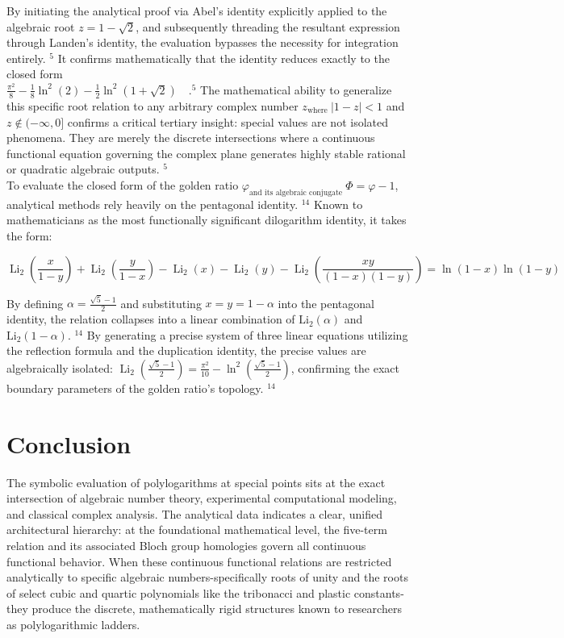 \documentclass[10pt]{article}
\begin{document}
By initiating the analytical proof via Abel's identity explicitly applied to the algebraic root $z=1-\sqrt{2}$, and subsequently threading the resultant expression through Landen's identity, the evaluation bypasses the necessity for integration entirely. ${ }^{5}$ It confirms mathematically that the identity reduces exactly to the closed form\\
$\frac{\pi^{2}}{8}-\frac{1}{8} \ln ^{2}(2)-\frac{1}{2} \ln ^{2}(1+\sqrt{2}) \quad .^{5}$ The mathematical ability to generalize this specific root relation to any arbitrary complex number $z_{\text {where }}|1-z|<1$ and $z \notin(-\infty, 0]$ confirms a critical tertiary insight: special values are not isolated phenomena. They are merely the discrete intersections where a continuous functional equation governing the complex plane generates highly stable rational or quadratic algebraic outputs. ${ }^{5}$\\
To evaluate the closed form of the golden ratio $\varphi_{\text {and its algebraic conjugate }} \Phi=\varphi-1$, analytical methods rely heavily on the pentagonal identity. ${ }^{14}$ Known to mathematicians as the most functionally significant dilogarithm identity, it takes the form:

$$
\operatorname{Li}_{2}\left(\frac{x}{1-y}\right)+\operatorname{Li}_{2}\left(\frac{y}{1-x}\right)-\operatorname{Li}_{2}(x)-\operatorname{Li}_{2}(y)-\operatorname{Li}_{2}\left(\frac{x y}{(1-x)(1-y)}\right)=\ln (1-x) \ln (1-y)
$$

By defining $\alpha=\frac{\sqrt{5}-1}{2}$ and substituting $x=y=1-\alpha$ into the pentagonal identity, the relation collapses into a linear combination of $\mathrm{Li}_{2}(\alpha)$ and $\mathrm{Li}_{2}(1-\alpha)$. ${ }^{14}$ By generating a precise system of three linear equations utilizing the reflection formula and the duplication identity, the precise values are algebraically isolated: $\operatorname{Li}_{2}\left(\frac{\sqrt{5}-1}{2}\right)=\frac{\pi^{2}}{10}-\ln ^{2}\left(\frac{\sqrt{5}-1}{2}\right)$, confirming the exact boundary parameters of the golden ratio's topology. ${ }^{14}$

\section*{Conclusion}
The symbolic evaluation of polylogarithms at special points sits at the exact intersection of algebraic number theory, experimental computational modeling, and classical complex analysis. The analytical data indicates a clear, unified architectural hierarchy: at the foundational mathematical level, the five-term relation and its associated Bloch group homologies govern all continuous functional behavior. When these continuous functional relations are restricted analytically to specific algebraic numbers-specifically roots of unity and the roots of select cubic and quartic polynomials like the tribonacci and plastic constants-they produce the discrete, mathematically rigid structures known to researchers as polylogarithmic ladders.
\end{document}
